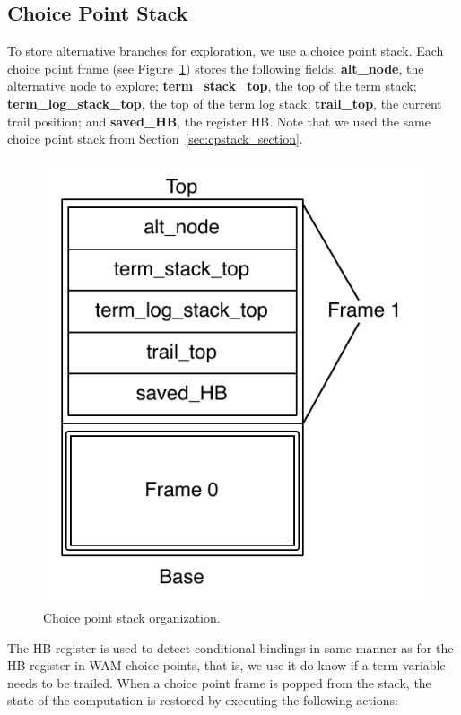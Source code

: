 \subsection{Choice Point Stack}

To store alternative branches for exploration, we use a choice point stack.
Each choice point frame
(see Figure~\ref{fig:choice_point_stack2})
stores the following fields:
\textbf{alt\_node}, the alternative node to explore;
\textbf{term\_stack\_top}, the top of the term stack;
\textbf{term\_log\_stack\_top}, the top of the term log stack;
\textbf{trail\_top}, the current trail position;
and \textbf{saved\_HB}, the register HB. Note that we used the same choice point stack
from Section~\ref{sec:cpstack_section}.

\begin{figure}[ht]
  \centering
    \includegraphics[scale=0.5]{choice_point_stack.pdf}
  \caption{Choice point stack organization.}
  \label{fig:choice_point_stack2}
\end{figure}

The HB register is used to detect conditional bindings in same manner as for the HB register in
WAM choice points, that is, we use it do know if a term variable needs to be trailed.
When a choice point frame is popped from the stack, the state of the computation is restored
by executing the following actions:

